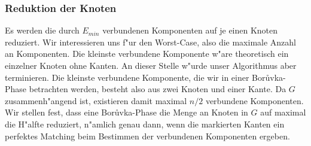 \subsubsection{Reduktion der Knoten}
Es werden die durch $E_{min}$ verbundenen Komponenten auf je einen Knoten 
    reduziert.
    Wir interessieren uns f"ur den Worst-Case, also die maximale Anzahl an 
    Komponenten.
    Die kleinste verbundene Komponente w"are theoretisch ein
    einzelner Knoten ohne Kanten.
    An dieser Stelle w"urde unser Algorithmus aber terminieren.
    Die kleinste verbundene Komponente, die wir in einer Bor\r uvka-Phase 
    betrachten werden, besteht also aus zwei Knoten und einer Kante.
    Da $G$ zusammenh"angend ist, existieren damit maximal $n/2$ verbundene
    Komponenten.\\
Wir stellen fest, dass eine Bor\r uvka-Phase die Menge an Knoten in $G$ auf 
    maximal die H"alfte reduziert, n"amlich genau dann, wenn die markierten 
    Kanten ein perfektes Matching beim Bestimmen der verbundenen Komponenten
    ergeben.\\
